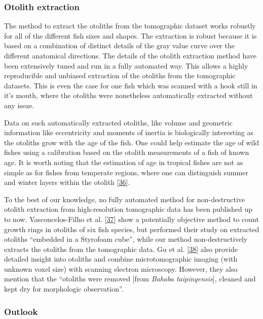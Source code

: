 \hypertarget{otolith-extraction}{%
\subsubsection{Otolith extraction}\label{otolith-extraction}}

The method to extract the otoliths from the tomographic dataset works robustly for all of the different fish sizes and shapes.
The extraction is robust because it is based on a combination of distinct details of the gray value curve over the different anatomical directions.
The details of the otolith extraction method have been extensively tuned and run in a fully automated way.
This allows a highly reproducible and unbiased extraction of the otoliths from the tomographic datasets.
This is even the case for one fish which was scanned with a hook still in it's mouth, where the otoliths were nonetheless automatically extracted without any issue.

Data on such automatically extracted otoliths, like volume and geometric information like eccentricity and moments of inertia is biologically interesting as the otoliths grow with the age of the fish.
One could help estimate the age of wild fishes using a calibration based on the otolith measurements of a fish of known age.
It is worth noting that the estimation of age in tropical fishes are not as simple as for fishes from temperate regions, where one can distinguish summer and winter layers within the otolith {[}\protect\hyperlink{ref-Iy1X7kEU}{36}{]}.

To the best of our knowledge, no fully automated method for non-destructive otolith extraction from high-resolution tomographic data has been published up to now.
Vasconcelos-Filho et al. {[}\protect\hyperlink{ref-PgMc4mCy}{37}{]} show a potentially objective method to count growth rings in otoliths of six fish species, but performed their study on extracted otoliths ``embedded in a Styrofoam cube'', while our method non-destructively extracts the otoliths from the tomographic data.
Gu et al. {[}\protect\hyperlink{ref-HYXdLQTV}{38}{]} also provide detailed insight into otoliths and combine microtomographic imaging (with unknown voxel size) with scanning electron microscopy.
However, they also mention that the ``otoliths were removed {[}from \emph{Bahaba taipingensis}{]}, cleaned and kept dry for morphologic observation''.

\hypertarget{outlook}{%
\subsubsection{Outlook}\label{outlook}}


